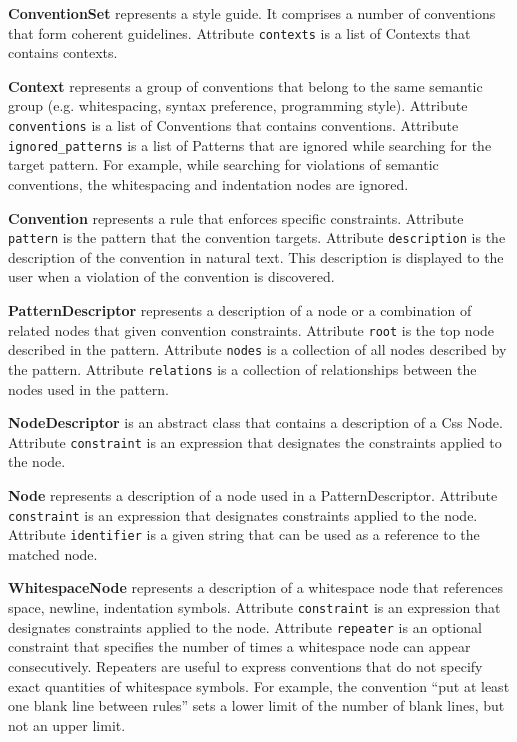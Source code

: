 \begin{description}

\item\textbf{ConventionSet} represents a style guide. It comprises a number of conventions that form coherent guidelines. Attribute \texttt{contexts} is a list of Contexts that contains contexts.

\item\textbf{Context} represents a group of conventions that belong to the same semantic group (e.g. whitespacing, syntax preference, programming style). Attribute \texttt{conventions} is a list of Conventions that contains conventions. Attribute \texttt{ignored\_patterns} is a list of Patterns that are ignored while searching for the target pattern. For example, while searching for violations of semantic conventions, the whitespacing and indentation nodes are ignored.

\item\textbf{Convention} represents a rule that enforces specific constraints. Attribute \texttt{pattern} is the pattern that the convention targets. Attribute \texttt{description} is the description of the convention in natural text. This description is displayed to the user when a violation of the convention is discovered.

\item\textbf{PatternDescriptor} represents a description of a node or a combination of related nodes that given convention constraints. Attribute \texttt{root} is the top node described in the pattern. Attribute \texttt{nodes} is a collection of all nodes described by the pattern. Attribute \texttt{relations} is a collection of relationships between the nodes used in the pattern.

\item\textbf{NodeDescriptor} is an abstract class that contains a description of a Css Node. Attribute
\texttt{constraint} is an expression that designates the constraints applied to the node.

\item\textbf{Node} represents a description of a node used in a PatternDescriptor. Attribute
\texttt{constraint} is an expression that designates constraints applied to the node.
Attribute \texttt{identifier} is a given string that can be used as a reference to the matched node.

\item\textbf{WhitespaceNode} represents a description of a whitespace node that references space,
newline, indentation symbols. Attribute \texttt{constraint} is an expression that designates
constraints applied to the node. Attribute \texttt{repeater} is an optional constraint that specifies
the number of times a whitespace node can appear consecutively. Repeaters are useful to express
conventions that do not specify exact quantities of whitespace symbols. For example, the convention
``put at least one blank line between rules'' sets a lower limit of the number of blank lines, but
not an upper limit.


\end{description}
